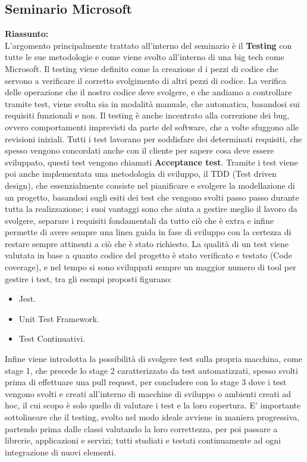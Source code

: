\documentclass{article}
\begin{document}
\subsection{Seminario Microsoft}
\textbf{Riassunto:}
\\ L'argomento principalmente trattato all'interno del seminario  è il \textbf{Testing} con tutte le sue metodologie e come viene svolto all'interno di una big tech come Microsoft.
Il testing viene definito come la creazione d i pezzi di codice che servono a verificare il corretto svolgimento di altri pezzi di codice. La verifica delle operazione che il nostro codice deve svolgere, e che andiamo a controllare tramite test, viene svolta sia in modalità manuale, che automatica, basandosi sui requisiti funzionali e non.
Il testing è anche incentrato alla correzione dei bug, ovvero comportamenti imprevisti da parte del software, che a volte sfuggono alle revisioni iniziali.
Tutti i test lavorano per soddisfare dei determinati requisiti, che spesso vengono concordati anche con il cliente per sapere cosa deve essere sviluppato, questi test vengono chiamati \textbf{Acceptance test}.
Tramite i test viene poi anche implementata una metodologia di sviluppo, il TDD (Test driven design), che essenzialmente consiste nel pianificare e svolgere la modellazione di un progetto, basandosi sugli esiti dei test che vengono svolti passo passo durante tutta la realizzazione; i suoi vantaggi sono che aiuta a gestire meglio il lavoro da svolgere, separare i requisiti fondamentali da tutto ciò che è extra e infine permette di avere sempre una linea guida in fase di sviluppo con la certezza di restare sempre attinenti a ciò che è stato richiesto.
La qualità di un test viene valutata in base a quanto codice del progetto è stato verificato e testato (Code coverage), e nel tempo si sono sviluppati sempre un maggior numero di tool per gestire i test, tra gli esempi proposti figurano: 
\begin{itemize}
    \item Jest.
    \item Unit Test Framework.
    \item Test Continuativi.  
\end{itemize}
Infine viene introdotta la possibilità di svolgere test sulla propria macchina, come stage 1, che precede lo stage 2 caratterizzato da test automatizzati, spesso svolti prima di effettuare una pull request, per concludere con lo stage 3 dove i test vengono svolti e creati all'interno di macchine di sviluppo o ambienti creati ad hoc, il cui scopo è solo quello di valutare i test e la loro copertura.
E' importante sottolineare che il testing, svolto nel modo ideale avviene in maniera progressiva, partendo prima dalle classi valutando la loro correttezza, per poi passare a librerie, applicazioni e servizi; tutti studiati e testati continuamente ad ogni integrazione di nuovi elementi.
\end{document}
